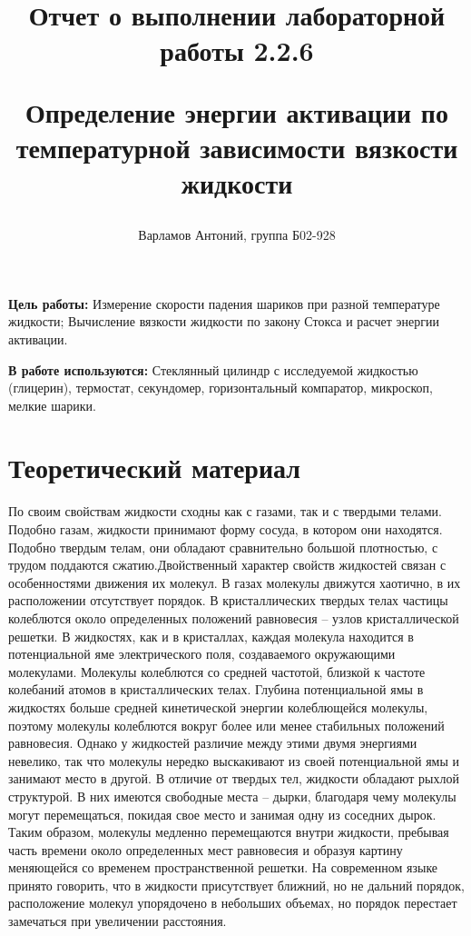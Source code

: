 \documentclass[12pt,a4paper]{article}
\title{
Отчет о выполнении лабораторной работы 2.2.6

Определение энергии активации по температурной зависимости вязкости жидкости
}
\author{Варламов Антоний, группа Б02-928}
\begin{document}
\maketitle
\newpage

\textbf{Цель работы:} Измерение скорости падения шариков при разной температуре жидкости; Вычисление вязкости жидкости по закону Стокса и расчет энергии активации.

\textbf{В работе используются:} Стеклянный цилиндр с исследуемой жидкостью (глицерин), термостат, секундомер, горизонтальный компаратор, микроскоп, мелкие шарики.

\section{Теоретический материал}

По своим свойствам жидкости сходны как с газами, так и с твердыми телами. Подобно газам, жидкости принимают форму сосуда, в котором они находятся. Подобно твердым телам, они обладают сравнительно большой плотностью, с трудом поддаются сжатию.Двойственный характер свойств жидкостей связан с особенностями движения их молекул. В газах молекулы движутся хаотично, в их расположении отсутствует порядок. В кристаллических твердых
телах частицы колеблются около определенных положений равновесия -- узлов кристаллической решетки. В жидкостях, как и в кристаллах, каждая молекула находится в потенциальной яме электрического поля, создаваемого окружающими молекулами. Молекулы колеблются со средней частотой, близкой к частоте колебаний атомов в кристаллических телах. Глубина потенциальной ямы в жидкостях больше средней кинетической энергии колеблющейся молекулы, поэтому молекулы колеблются вокруг более или менее стабильных положений равновесия. Однако у жидкостей различие между этими двумя энергиями невелико, так что молекулы нередко выскакивают из своей потенциальной ямы и занимают место в другой. В отличие от твердых тел, жидкости обладают  рыхлой структурой. В них имеются свободные места  -- дырки, благодаря чему молекулы могут перемещаться, покидая свое место и занимая одну из соседних дырок. Таким образом, молекулы медленно перемещаются внутри жидкости, пребывая часть времени около определенных мест равновесия и образуя картину меняющейся со временем пространственной решетки. На современном языке принято говорить, что в жидкости присутствует ближний, но не дальний порядок, расположение молекул упорядочено в небольших объемах, но порядок перестает замечаться при увеличении расстояния.
\end{document}
